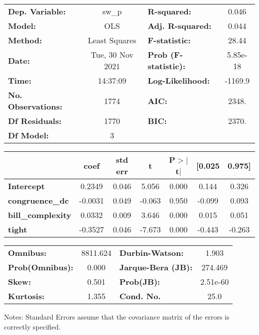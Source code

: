 \begin{center}
\begin{tabular}{lclc}
\toprule
\textbf{Dep. Variable:}    &      sw\_p       & \textbf{  R-squared:         } &     0.046   \\
\textbf{Model:}            &       OLS        & \textbf{  Adj. R-squared:    } &     0.044   \\
\textbf{Method:}           &  Least Squares   & \textbf{  F-statistic:       } &     28.44   \\
\textbf{Date:}             & Tue, 30 Nov 2021 & \textbf{  Prob (F-statistic):} &  5.85e-18   \\
\textbf{Time:}             &     14:37:09     & \textbf{  Log-Likelihood:    } &   -1169.9   \\
\textbf{No. Observations:} &        1774      & \textbf{  AIC:               } &     2348.   \\
\textbf{Df Residuals:}     &        1770      & \textbf{  BIC:               } &     2370.   \\
\textbf{Df Model:}         &           3      & \textbf{                     } &             \\
\bottomrule
\end{tabular}
\begin{tabular}{lcccccc}
                          & \textbf{coef} & \textbf{std err} & \textbf{t} & \textbf{P$> |$t$|$} & \textbf{[0.025} & \textbf{0.975]}  \\
\midrule
\textbf{Intercept}        &       0.2349  &        0.046     &     5.056  &         0.000        &        0.144    &        0.326     \\
\textbf{congruence\_dc}   &      -0.0031  &        0.049     &    -0.063  &         0.950        &       -0.099    &        0.093     \\
\textbf{bill\_complexity} &       0.0332  &        0.009     &     3.646  &         0.000        &        0.015    &        0.051     \\
\textbf{tight}            &      -0.3527  &        0.046     &    -7.673  &         0.000        &       -0.443    &       -0.263     \\
\bottomrule
\end{tabular}
\begin{tabular}{lclc}
\textbf{Omnibus:}       & 8811.624 & \textbf{  Durbin-Watson:     } &    1.903  \\
\textbf{Prob(Omnibus):} &   0.000  & \textbf{  Jarque-Bera (JB):  } &  274.469  \\
\textbf{Skew:}          &   0.501  & \textbf{  Prob(JB):          } & 2.51e-60  \\
\textbf{Kurtosis:}      &   1.355  & \textbf{  Cond. No.          } &     25.0  \\
\bottomrule
\end{tabular}
\end{center}

Notes: \newline
 [1] Standard Errors assume that the covariance matrix of the errors is correctly specified.